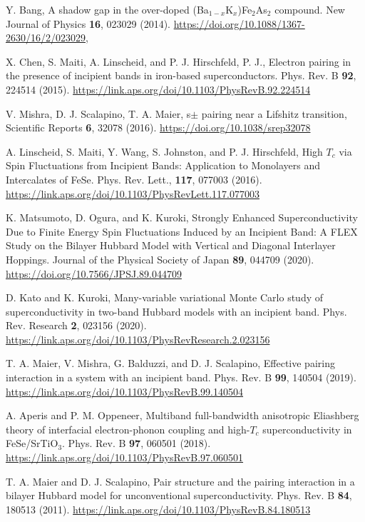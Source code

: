 \documentclass[prb,twocolumn,amsmath,amssymb,superscriptaddress,floatfix,nofootinbib]{revtex4-2}
\begin{document}
\begin{thebibliography}{}
Y. Bang, {A shadow gap in the over-doped {(Ba$_{1-x}$K$_x$)Fe$_2$As$_2$} compound}. {New Journal of Physics} {\bf 16}, {023029} (2014). \url{https://doi.org/10.1088/1367-2630/16/2/023029},

X. Chen, S. Maiti, A. Linscheid, and P. J. Hirschfeld, P. J., {Electron pairing in the presence of incipient bands in iron-based superconductors}. Phys. Rev. B {\bf 92}, 224514 (2015). \url{https://link.aps.org/doi/10.1103/PhysRevB.92.224514}

V. Mishra, D. J. Scalapino, T. A. Maier, {s$\pm$ pairing near a {{Lifshitz}} transition}, Scientific Reports {\bf 6}, 32078 (2016). \url{https://doi.org/10.1038/srep32078}

A. Linscheid, S. Maiti, Y. Wang, S. Johnston, and P. J. Hirschfeld, {High ${T}_{c}$ via Spin Fluctuations from Incipient Bands: Application to Monolayers and Intercalates of FeSe.} Phys. Rev. Lett., {\bf 117}, {077003} (2016). 
\url{https://link.aps.org/doi/10.1103/PhysRevLett.117.077003}

K. Matsumoto, D. Ogura, and K. Kuroki, {Strongly Enhanced Superconductivity Due to Finite Energy Spin Fluctuations Induced by an Incipient Band: A {FLEX} Study on the Bilayer {{Hubbard}} Model with Vertical and Diagonal Interlayer Hoppings}. 
Journal of the Physical Society of Japan {\bf 89}, 044709 (2020). \url{https://doi.org/10.7566/JPSJ.89.044709}

D. Kato and K. Kuroki, {Many-variable variational {{Monte Carlo}} study of superconductivity in two-band {Hubbard} models with an incipient band}. {Phys. Rev. Research} {\bf 2}, {023156} (2020). \url{https://link.aps.org/doi/10.1103/PhysRevResearch.2.023156}

T. A. Maier, V. Mishra, G. Balduzzi, and D. J. Scalapino, {Effective pairing interaction in a system with an incipient band}. Phys. Rev. B {\bf 99}, 140504 (2019). \url{https://link.aps.org/doi/10.1103/PhysRevB.99.140504}

A. Aperis and P. M. Oppeneer, {Multiband full-bandwidth anisotropic {Eliashberg} theory of interfacial electron-phonon coupling and {high-$T_c$} superconductivity in {{FeSe}/SrTiO$_3$}}. Phys. Rev. B {\bf 97}, {060501} (2018). \url{https://link.aps.org/doi/10.1103/PhysRevB.97.060501}

T. A. Maier and D. J. Scalapino, {Pair structure and the pairing interaction in a bilayer {Hubbard} model for unconventional superconductivity}. Phys. Rev. B {\bf 84}, {180513} (2011). \url{https://link.aps.org/doi/10.1103/PhysRevB.84.180513}


\end{thebibliography}
\end{document}

